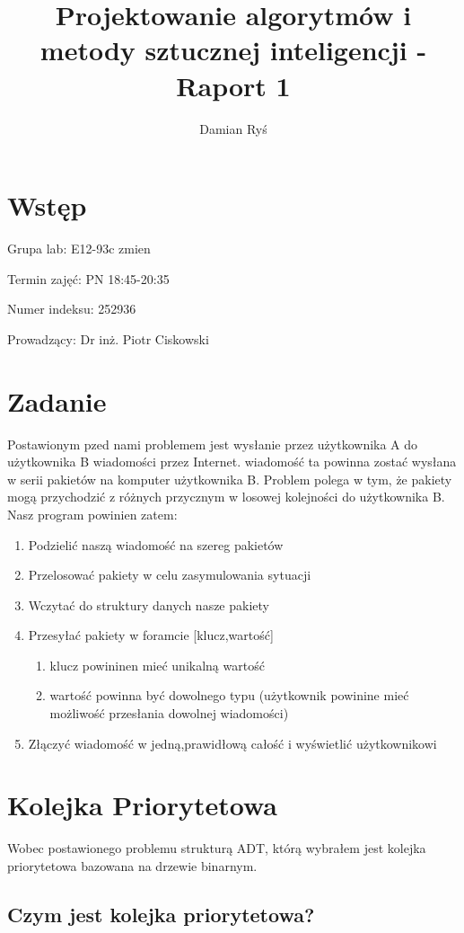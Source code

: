 \documentclass{article}
\title{Projektowanie algorytmów i metody sztucznej inteligencji - Raport 1}
\author{Damian Ryś}
\begin{document}
\maketitle


\tableofcontents
\section{Wstęp}
Grupa lab: E12-93c zmien

Termin zajęć: PN 18:45-20:35

Numer indeksu: 252936

Prowadzący: Dr inż. Piotr Ciskowski

\section{Zadanie}
Postawionym pzed nami problemem jest wysłanie przez użytkownika A do użytkownika B wiadomości przez Internet.
wiadomość ta powinna zostać wysłana w serii pakietów na komputer użytkownika B.
Problem polega w tym, że pakiety mogą przychodzić z różnych przycznym w losowej kolejności do użytkownika B.
Nasz program powinien zatem:
\begin{enumerate}
    \item Podzielić naszą wiadomość na szereg pakietów
    \item Przelosować pakiety w celu zasymulowania sytuacji
    \item Wczytać do struktury danych nasze pakiety
    \item Przesyłać pakiety w foramcie [klucz,wartość]
    \begin{enumerate}
        \item klucz powininen mieć unikalną wartość
        \item wartość powinna być dowolnego typu (użytkownik powinine mieć możliwość przesłania dowolnej wiadomości)
    \end{enumerate}
    \item Złączyć wiadomość w jedną,prawidłową całość i wyświetlić użytkownikowi
\end{enumerate}
\section{Kolejka Priorytetowa}
Wobec postawionego problemu strukturą ADT, którą wybrałem jest kolejka priorytetowa bazowana na drzewie binarnym.
\subsection{Czym jest kolejka priorytetowa?}
\end{document}
